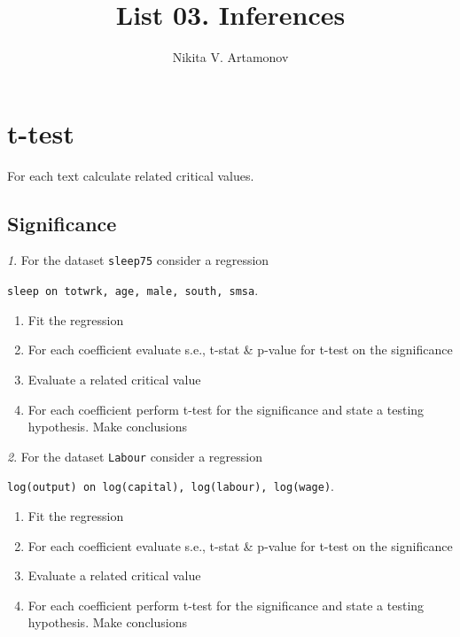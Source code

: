 \documentclass[12pt]{article}
\title{List 03. Inferences}
\author{Nikita V. Artamonov}
\theoremstyle{remark}
\newtheorem{problem}{}[section]
\begin{document}
\maketitle

\tableofcontents

\section{t-test}

For each text calculate related critical values.

\subsection{Significance}

\begin{problem}
For the dataset \texttt{sleep75} consider a regression
\begin{center}
	\texttt{sleep on totwrk, age, male, south, smsa}.
\end{center}
\begin{enumerate}
	\item Fit the regression
	\item For each coefficient evaluate s.e., t-stat \& p-value for t-test on the significance 
	\item Evaluate a related critical value
	\item For each coefficient perform t-test for the significance and state a testing hypothesis. 
	Make conclusions
\end{enumerate}
\end{problem}

\begin{problem}
For the dataset \texttt{Labour} consider a regression
\begin{center}
	\texttt{log(output) on log(capital), log(labour), log(wage)}.
\end{center}
\begin{enumerate}
	\item Fit the regression
	\item For each coefficient evaluate s.e., t-stat \& p-value for t-test on the significance 
	\item Evaluate a related critical value
	\item For each coefficient perform t-test for the significance and state a testing hypothesis.
	Make conclusions
\end{enumerate}
\end{problem}
\end{document}
